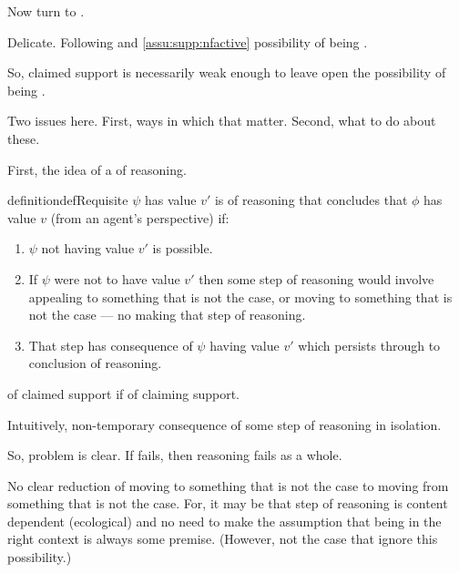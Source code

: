 \begin{note}
  Now turn to \ideaCSB{}.

  Delicate.
  Following \ideaCSA{} and \ref{assu:supp:nfactive} possibility of being \mom{}.

  So, claimed support is necessarily weak enough to leave open the possibility of being \mom{}.

  Two issues here.
  First, ways in which \mom{} that matter.
  Second, what to do about these.
\end{note}


\begin{note}
  First, the idea of a \requ{} of reasoning.

  \begin{restatable}{definition}{defRequisite}\label{def:requisite}
    \(\psi\) has value \(v'\) is \requ{} of reasoning that concludes that \(\phi\) has value \(v\) (from an agent's perspective) if:
    \begin{enumerate}
    \item \(\psi\) not having value \(v'\) is possible.
    \item If \(\psi\) were not to have value \(v'\) then some step of reasoning would involve appealing to something that is not the case, or moving to something that is not the case --- no making that step of reasoning.
    \item That step has consequence of \(\psi\) having value \(v'\) which persists through to conclusion of reasoning.
    \end{enumerate}

     of claimed support if \requ{} of claiming support.
  \end{restatable}
  Intuitively, non-temporary consequence of some step of reasoning in isolation.

  So, problem is clear.
  If \requ{} fails, then reasoning fails as a whole.
\end{note}

\begin{note}
  No clear reduction of moving to something that is not the case to moving from something that is not the case.
  For, it may be that step of reasoning is content dependent {\color{red} (ecological)} and no need to make the assumption that being in the right context is always some premise.
  (However, not the case that ignore this possibility.)
\end{note}

